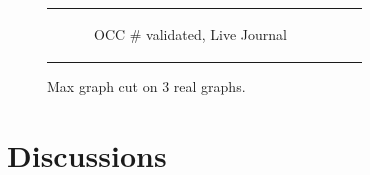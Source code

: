 \documentclass{article} %
\begin{document}
\begin{figure}[ht]
\begin{tabular}{ccc}
\begin{subfigure}[b]{0.31\textwidth}
			\caption{OCC \# validated, Live Journal}
			\label{fig:validated_OCC_livejournal_maxgraphcut}
	  \end{subfigure} \\
  \end{tabular}
  \caption{Max graph cut on 3 real graphs.}
\end{figure}



\section{Discussions}

{\footnotesize




}

\newpage
\appendix



\newpage
\end{document}
